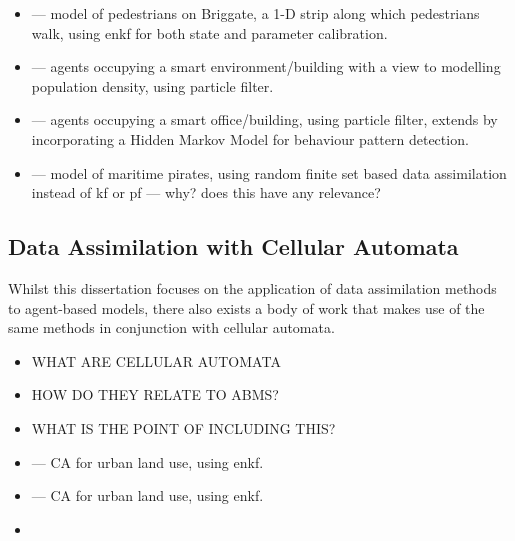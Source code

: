 \begin{itemize}
    \item \cite{ward2016dynamic} --- model of pedestrians on Briggate, a 1-D
        strip along which pedestrians walk, using enkf for both state and
        parameter calibration.
    \item \cite{wang2013data, wang2015data} --- agents occupying a smart
        environment/building with a view to modelling population density, using
        particle filter.
    \item \cite{rai2013behavior} --- agents occupying a smart office/building,
        using particle filter, extends \cite{wang2013data, wang2015data} by
        incorporating a Hidden Markov Model for behaviour pattern detection.
    \item \cite{wang2017random} --- model of maritime pirates, using random
        finite set based data assimilation instead of kf or pf --- why? does
        this have any relevance?
\end{itemize}

\subsection{Data Assimilation with Cellular Automata}\label{sub:lit_rev:da:ca}

Whilst this dissertation focuses on the application of data assimilation methods
to agent-based models, there also exists a body of work that makes use of the
same methods in conjunction with cellular automata.

\begin{itemize}
    \item WHAT ARE CELLULAR AUTOMATA
    \item HOW DO THEY RELATE TO ABMS?
    \item WHAT IS THE POINT OF INCLUDING THIS?
\end{itemize}

\begin{itemize}
    \item \cite{li2017exploring} --- CA for urban land use, using enkf.
    \item \cite{li2012assimilating} --- CA for urban land use, using enkf.
    \item 
\end{itemize}

